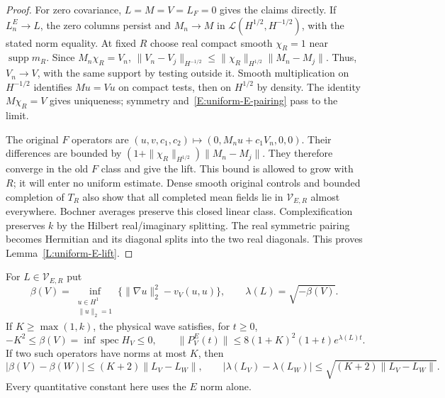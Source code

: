\begin{proof}
  For zero covariance, $L = M = V = L_F = 0$ gives the claims directly. If
  $L_n^E \to L$, the zero columns persist and $M_n \to M$ in
  $\mathcal{L}(H^{1/2},H^{-1/2})$, with the stated norm equality. At fixed $R$
  choose real compact smooth $\chi_R = 1$ near $\operatorname{supp}m_R$. Since
  $M_n\chi_R = V_n$, $\|V_n-V_j\|_{H^{-1/2}} \le
  \|\chi_R\|_{H^{1/2}}\|M_n-M_j\|$. Thus, $V_n \to V$, with the same support by
  testing outside it. Smooth multiplication on $H^{-1/2}$ identifies $Mu = Vu$
  on compact tests, then on $H^{1/2}$ by density. The identity $M\chi_R = V$
  gives uniqueness; symmetry and~\eqref{E:uniform-E-pairing} pass to the limit.

  The original $F$ operators are $(u,v,c_1,c_2)\mapsto(0,M_nu+c_1V_n,0,0)$.
  Their differences are bounded by $(1+\|\chi_R\|_{H^{1/2}})\|M_n-M_j\|$. They
  therefore converge in the old $F$ class and give the lift. This bound is
  allowed to grow with $R$; it will enter no uniform estimate. Dense smooth
  original controls and bounded completion of $T_R$ also show that all completed
  mean fields lie in $\mathcal{V}_{E,R}$ almost everywhere. Bochner averages
  preserve this closed linear class. Complexification preserves $k$ by the
  Hilbert real/imaginary splitting. The real symmetric pairing becomes Hermitian
  and its diagonal splits into the two real diagonals. This proves
  Lemma~\ref{L:uniform-E-lift}.
\end{proof}

\begin{proposition}\label{P:uniform-E-spectral}
  For $L \in \mathcal{V}_{E,R}$ put
  \[
    \beta(V)=\inf_{\substack{u\in H^1\\\|u\|_2=1}}
    \{\|\nabla u\|_2^2-v_V(u,u)\},\qquad \lambda(L)=\sqrt{-\beta(V)} .
  \]
  If $K \ge \max(1,k)$, the physical wave satisfies, for $t \ge 0$,
  \begin{equation}\label{E:uniform-E-static-bound}
    -K^2\le\beta(V)=\inf\operatorname{spec}H_V\le0,\qquad
    \|P_V^E(t)\|\le8(1+K)^2(1+t)e^{\lambda(L)t}.
  \end{equation}
  If two such operators have norms at most $K$, then
  \begin{equation}\label{E:uniform-E-rate-continuity}
    |\beta(V)-\beta(W)|\le(K+2)\|L_V-L_W\|,\qquad
    |\lambda(L_V)-\lambda(L_W)|
    \le\sqrt{(K+2)\|L_V-L_W\|}.
  \end{equation}
  Every quantitative constant here uses the $E$ norm alone.
\end{proposition}

